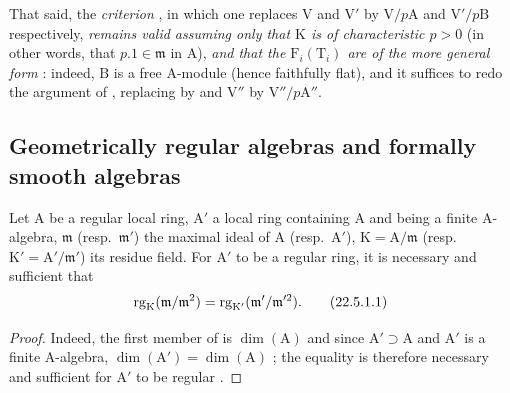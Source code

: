 \begin{remark}[22.4.8]
That said, the \emph{criterion} , in which one replaces $\mathrm{V}$ and $\mathrm{V}'$ by $\mathrm{V}/p\mathrm{A}$ and $\mathrm{V}'/p\mathrm{B}$ respectively, \emph{remains valid assuming only that $\mathrm{K}$ is of characteristic $p>0$} (in other words, that $p.1\in\mathfrak{m}$ in $\mathrm{A}$), \emph{and that the $\mathrm{F}_i(\mathrm{T}_i)$ are of the more general form} : indeed, $\mathrm{B}$ is a free $\mathrm{A}$-module (hence faithfully flat), and it suffices to redo the argument of , replacing  by  and $\mathrm{V}''$ by $\mathrm{V}''/p\mathrm{A}''$.
\end{remark}

\subsection{Geometrically regular algebras and formally smooth algebras}
\label{subsection:0.22.5}

\begin{proposition}[22.5.1]
\label{0.22.5.1}
Let $\mathrm{A}$ be a regular local ring, $\mathrm{A}'$ a local ring containing $\mathrm{A}$ and being a finite $\mathrm{A}$-algebra, $\mathfrak{m}$ \textup{(resp.~$\mathfrak{m}'$)} the maximal ideal of $\mathrm{A}$ \textup{(resp.~$\mathrm{A}'$)}, $\mathrm{K}=\mathrm{A}/\mathfrak{m}$ \textup{(resp.~$\mathrm{K}'=\mathrm{A}'/\mathfrak{m}'$)} its residue field.
For $\mathrm{A}'$ to be a regular ring, it is necessary and sufficient that
\[
\label{0.22.5.1.1}
  \operatorname{rg}_\mathrm{K}(\mathfrak{m}/\mathfrak{m}^2)=\operatorname{rg}_{\mathrm{K}'}(\mathfrak{m}'/\mathfrak{m}'^2).
  \tag{22.5.1.1}
\]
\end{proposition}

\begin{proof}
Indeed, the first member of  is $\dim(\mathrm{A})$  and since $\mathrm{A}'\supset\mathrm{A}$ and $\mathrm{A}'$ is a finite $\mathrm{A}$-algebra, $\dim(\mathrm{A}')=\dim(\mathrm{A})$ ; the equality  is therefore necessary and sufficient for $\mathrm{A}'$ to be regular .
\end{proof}

